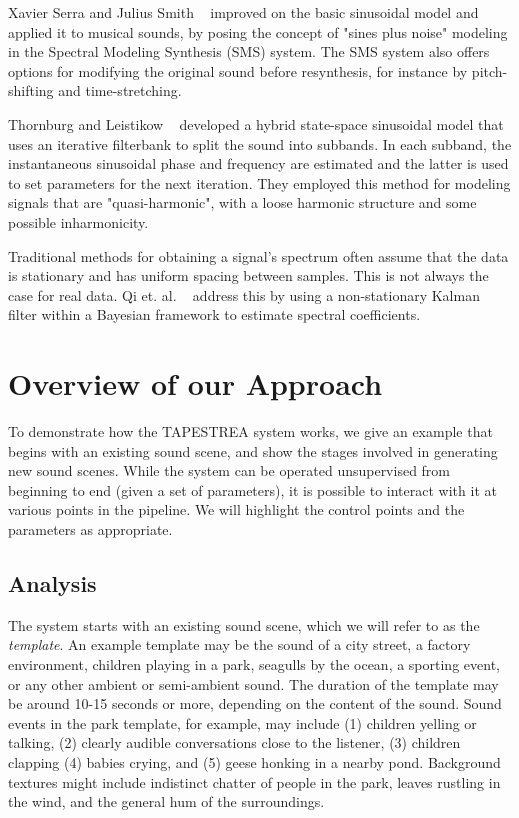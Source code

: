 \documentclass{acmsiggraph}               %
\begin{document}
Xavier Serra and Julius Smith 
~ improved on the basic sinusoidal model and applied it to musical sounds, by posing the concept of 
"sines plus noise" modeling in the Spectral Modeling Synthesis (SMS) system. The SMS system also 
offers options for modifying the original sound before resynthesis, for instance by 
pitch-shifting and time-stretching.

Thornburg and Leistikow ~ developed a hybrid state-space sinusoidal 
model that uses an iterative filterbank to split the sound into subbands. In each subband, the 
instantaneous sinusoidal phase and frequency are estimated and the latter is used to set 
parameters for the next iteration. They employed this method for modeling signals that are 
"quasi-harmonic", with a loose harmonic structure and some possible inharmonicity. 

Traditional methods for obtaining a signal's spectrum often assume that the data is stationary 
and has uniform spacing between samples. This is not always the case for real data. Qi et. al. 
~ address this by using a non-stationary Kalman filter within a Bayesian 
framework to estimate spectral coefficients. 


\section{Overview of our Approach}

To demonstrate how the TAPESTREA system works, we give an example that begins with 
an existing sound scene, and show the stages involved in generating new 
sound scenes.    While the system can be operated unsupervised from 
beginning to end (given a set of parameters), it is possible to interact 
with it at various points in the pipeline.  We will highlight the control 
points and the parameters as appropriate.

\subsection{Analysis}
The system starts with an existing sound scene, which we will refer to as the
\textit{template}.  An example template may be the sound of a city street, a factory 
environment, children playing in a park, seagulls by the ocean, a sporting event, or any other
ambient or semi-ambient sound.  The duration of 
the template may be around 10-15 seconds or more, depending on the
content of the sound.  Sound events in the park template, for example, 
may include (1) children yelling or talking, (2) clearly audible 
conversations close to the listener,  (3) children clapping (4) babies 
crying, and (5) geese honking in a nearby pond. Background textures 
might include indistinct chatter of people in the park, leaves rustling 
in the wind, and the general hum of the surroundings.
\end{document}
